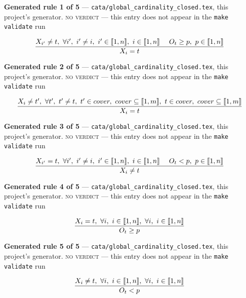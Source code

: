 \documentclass[10pt,a4paper]{article}
\newcommand{\rulebox}[1]{%
  \[\resizebox{\ifdim\width>\linewidth\linewidth\else\width\fi}{!}%
    {$\displaystyle #1$}\]}
\begin{document}
{\small\textbf{Generated rule 1 of 5} --- \texttt{cata/global\_cardinality\_closed.tex}, this project's generator. \textsc{no verdict} --- this entry does not appear in the \texttt{make validate} run\par}
\rulebox{\frac{X_{i'} \neq t,~\forall i',~i' \neq i,~i' \in \llbracket1,n\rrbracket,~i \in \llbracket1,n\rrbracket~~~~O_{t} \geq p,~p \in \llbracket1,n\rrbracket}{X_{i}=t}}

{\small\textbf{Generated rule 2 of 5} --- \texttt{cata/global\_cardinality\_closed.tex}, this project's generator. \textsc{no verdict} --- this entry does not appear in the \texttt{make validate} run\par}
\rulebox{\frac{X_{i} \neq t',~\forall t',~t' \neq t,~t' \in cover,~cover \subseteq \llbracket1,m\rrbracket,~t \in cover,~cover \subseteq \llbracket1,m\rrbracket}{X_{i}=t}}

{\small\textbf{Generated rule 3 of 5} --- \texttt{cata/global\_cardinality\_closed.tex}, this project's generator. \textsc{no verdict} --- this entry does not appear in the \texttt{make validate} run\par}
\rulebox{\frac{X_{i'}=t,~\forall i',~i' \neq i,~i' \in \llbracket1,n\rrbracket,~i \in \llbracket1,n\rrbracket~~~~O_{t}<p,~p \in \llbracket1,n\rrbracket}{X_{i} \neq t}}

{\small\textbf{Generated rule 4 of 5} --- \texttt{cata/global\_cardinality\_closed.tex}, this project's generator. \textsc{no verdict} --- this entry does not appear in the \texttt{make validate} run\par}
\rulebox{\frac{X_{i}=t,~\forall i,~i \in \llbracket1,n\rrbracket,~\forall i,~i \in \llbracket1,n\rrbracket}{O_{t} \geq p}}

{\small\textbf{Generated rule 5 of 5} --- \texttt{cata/global\_cardinality\_closed.tex}, this project's generator. \textsc{no verdict} --- this entry does not appear in the \texttt{make validate} run\par}
\rulebox{\frac{X_{i} \neq t,~\forall i,~i \in \llbracket1,n\rrbracket,~\forall i,~i \in \llbracket1,n\rrbracket}{O_{t}<p}}
\end{document}
